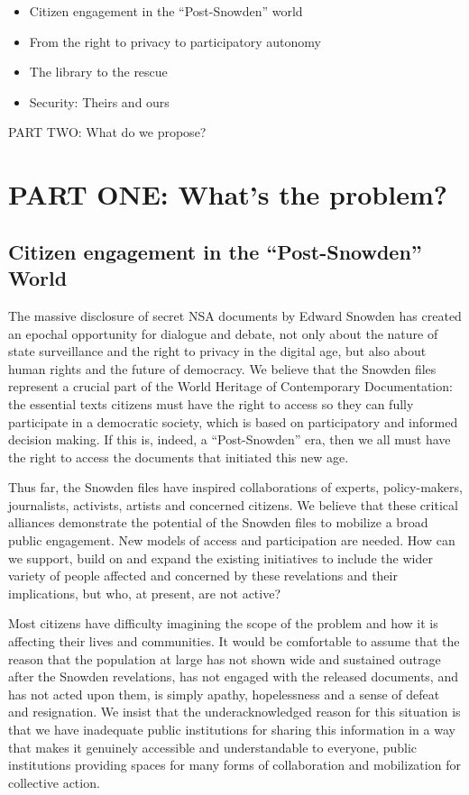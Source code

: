 \documentclass[a4paper,
fontsize=11pt,
oneside,
numbers=noperiodatend,
parskip=half-,
bibliography=totoc,
final
]{scrartcl}
\begin{document}
\begin{itemize}
\item
  Citizen engagement in the \enquote{Post-Snowden} world
\item
  From the right to privacy to participatory autonomy
\item
  The library to the rescue
\item
  Security: Theirs and ours
\end{itemize}

PART TWO: What do we propose?

\section*{PART ONE: What's the
problem?}\label{part-one-whats-the-problem}

\subsection*{Citizen engagement in the \enquote{Post-Snowden}
World}\label{citizen-engagement-in-the-post-snowden-world}

The massive disclosure of secret NSA documents by Edward Snowden has
created an epochal opportunity for dialogue and debate, not only about
the nature of state surveillance and the right to privacy in the digital
age, but also about human rights and the future of democracy. We believe
that the Snowden files represent a crucial part of the World Heritage of
Contemporary Documentation: the essential texts citizens must have the
right to access so they can fully participate in a democratic society,
which is based on participatory and informed decision making. If this
is, indeed, a \enquote{Post-Snowden} era, then we all must have the
right to access the documents that initiated this new age.

Thus far, the Snowden files have inspired collaborations of experts,
policy-makers, journalists, activists, artists and concerned citizens.
We believe that these critical alliances demonstrate the potential of
the Snowden files to mobilize a broad public engagement. New models of
access and participation are needed. How can we support, build on and
expand the existing initiatives to include the wider variety of people
affected and concerned by these revelations and their implications, but
who, at present, are not active?

Most citizens have difficulty imagining the scope of the problem and how
it is affecting their lives and communities. It would be comfortable to
assume that the reason that the population at large has not shown wide
and sustained outrage after the Snowden revelations, has not engaged
with the released documents, and has not acted upon them, is simply
apathy, hopelessness and a sense of defeat and resignation. We insist
that the underacknowledged reason for this situation is that we have
inadequate public institutions for sharing this information in a way
that makes it genuinely accessible and understandable to everyone,
public institutions providing spaces for many forms of collaboration and
mobilization for collective action.
\end{document}
